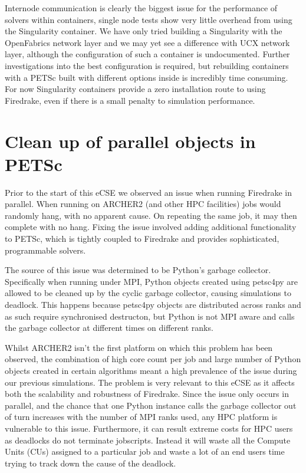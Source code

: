 \documentclass[a4paper,11pt]{article}
\begin{document}
Internode communication is clearly the biggest issue for the performance of solvers within containers, single node tests show very little overhead from using the Singularity container.
We have only tried building a Singularity with the OpenFabrics network layer and we may yet see a difference with UCX network layer, although the configuration of such a container is undocumented.
Further investigations into the best configuration is required, but rebuilding containers with a PETSc built with different options inside is incredibly time consuming.
For now Singularity containers provide a zero installation route to using Firedrake, even if there is a small penalty to simulation performance.


\section{Clean up of parallel objects in PETSc}
\label{sec:other}
Prior to the start of this eCSE we observed an issue when running Firedrake in parallel.
When running on ARCHER2 (and other HPC facilities) jobs would randomly hang, with no apparent cause.
On repeating the same job, it may then complete with no hang.
Fixing the issue involved adding additional functionality to PETSc, which is tightly coupled to Firedrake and provides sophisticated, programmable solvers\cite{petsc}.

The source of this issue was determined to be Python's garbage collector.
Specifically when running under MPI, Python objects created using petsc4py are allowed to be cleaned up by the cyclic garbage collector, causing simulations to deadlock.
This happens because petsc4py objects are distributed across ranks and as such require synchronised destructon, but Python is not MPI aware and calls the garbage collector at different times on different ranks.

Whilst ARCHER2 isn't the first platform on which this problem has been observed, the combination of high core count per job and large number of Python objects created in certain algorithms meant a high prevalence of the issue during our previous simulations.
The problem is very relevant to this eCSE as it affects both the scalability and robustness of Firedrake.
Since the issue only occurs in parallel, and the chance that one Python instance calls the garbage collector out of turn increases with the number of MPI ranks used, any HPC platform is vulnerable to this issue.
Furthermore, it can result extreme costs for HPC users as deadlocks do not terminate jobscripts.
Instead it will waste all the Compute Units (CUs) assigned to a particular job and waste a lot of an end users time trying to track down the cause of the deadlock.
\end{document}
